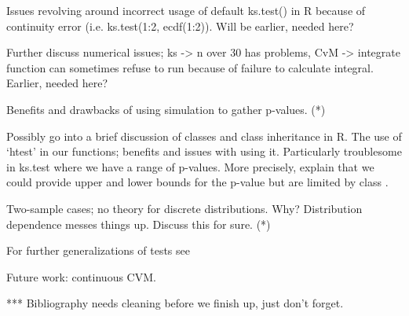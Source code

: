 \documentclass[article]{jss}
\begin{document}
Issues revolving around incorrect usage of default ks.test() in R because of continuity error (i.e. ks.test(1:2, ecdf(1:2)).  Will be earlier, needed here?

Further discuss numerical issues; ks -> n over 30 has problems, CvM -> integrate function can sometimes refuse to run because of failure to calculate integral.
Earlier, needed here?

Benefits and drawbacks of using simulation to gather p-values. (*)

Possibly go into a brief discussion of classes and class inheritance in R. The use of `htest' in our functions; benefits and issues with using it. Particularly troublesome in ks.test where we have a range of p-values.  More precisely, explain that we
could provide upper and lower bounds for the p-value but are limited by class
.

Two-sample cases; no theory for discrete distributions. Why? Distribution dependence messes things up. Discuss this for sure. (*)

For further generalizations of tests see \cite{dewev1973}

Future work: continuous CVM.


*** Bibliography needs cleaning before we finish up, just don't forget.


%

\end{document}
